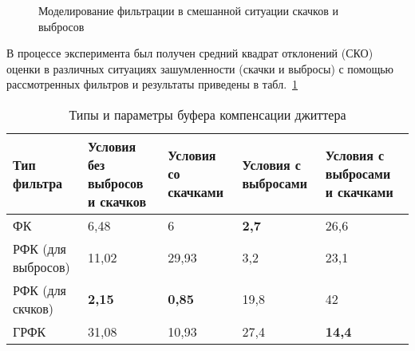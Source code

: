 \clearpage

\pgfplotsset{width=15cm, height=10cm, compat=1.3}
\begin{figure} [h]
  \center
{}
\caption{Моделирование фильтрации в смешанной ситуации скачков и выбросов}
  \label{img3:filterMix}
\end{figure}




В процессе эксперимента был получен средний квадрат отклонений (СКО) оценки в различных ситуациях зашумленности (скачки и выбросы) с помощью рассмотренных фильтров и результаты приведены в табл. \ref{fkDiffSit}



\begin{table} [h]
  \centering
  \parbox{15cm}{\caption{Типы и параметры буфера компенсации джиттера}\label{fkDiffSit}}
\begin{tabular}{|p{3cm}|p{3cm}|p{3cm}|p{3cm}|p{3cm}|}
    \hline
    Тип фильтра        & Условия без выбросов и скачков & Условия со скачками & Условия с выбросами & Условия с выбросами и скачками \\ \hline
    ФК                 & 6,48                           & 6                   & \textbf{2,7}                 & 26,6                           \\ \hline
    РФК (для выбросов) & 11,02                          & 29,93               & 3,2                 & 23,1                           \\ \hline
    РФК (для скчков)   & \textbf{2,15}                           & \textbf{0,85}                & 19,8                & 42                             \\ \hline
    ГРФК               & 31,08                          & 10,93               & 27,4                & \textbf{14,4}                           \\ \hline
    \end{tabular}
\end{table}








